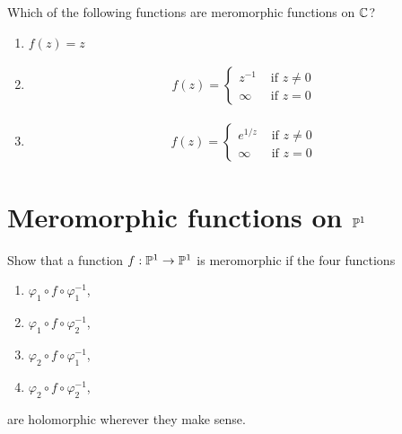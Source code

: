 \documentclass{article}
\begin{document}
    \begin{qbox}
      Which of the following functions are meromorphic functions on $\mathbb{C}$?
      \begin{enumerate}
        \item $f(z) = z$
        \item \begin{align*}
            f(z) = \begin{cases}
                    z^{-1} & \mbox{ if } z \neq 0\\
                    \infty & \mbox{ if } z = 0
                  \end{cases}
          \end{align*}
        \item \begin{align*}
            f(z) = \begin{cases}
                    e^{1/z} & \mbox{ if } z \neq 0\\
                    \infty & \mbox{ if } z = 0
                  \end{cases}
          \end{align*}
      \end{enumerate}
    \end{qbox}










    \section*{Meromorphic functions on $\mathbb{P}^1$}
    \begin{qbox}
      Show that a function $f: \mathbb{P}^1 \rightarrow \mathbb{P}^1$ is meromorphic if the four functions
      \begin{enumerate}
        \item $\varphi_1 \circ f \circ \varphi_1^{-1}$,
        \item $\varphi_1 \circ f \circ \varphi_2^{-1}$,
        \item $\varphi_2 \circ f \circ \varphi_1^{-1}$,
        \item $\varphi_2 \circ f \circ \varphi_2^{-1}$,
      \end{enumerate}
      are holomorphic wherever they make sense.
    \end{qbox}
\end{document}
